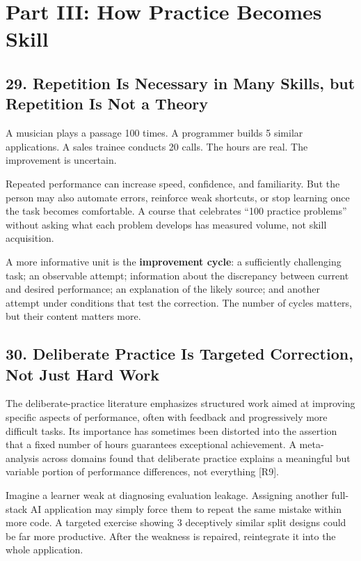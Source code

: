 \section*{Part III: How Practice Becomes Skill}

\subsection*{29. Repetition Is Necessary in Many Skills, but Repetition Is Not a Theory}

A musician plays a passage 100 times. A programmer builds 5 similar applications. A sales trainee conducts 20 calls. The hours are real. The improvement is uncertain.

Repeated performance can increase speed, confidence, and familiarity. But the person may also automate errors, reinforce weak shortcuts, or stop learning once the task becomes comfortable. A course that celebrates ``100 practice problems'' without asking what each problem develops has measured volume, not skill acquisition.

A more informative unit is the \textbf{improvement cycle}: a sufficiently challenging task; an observable attempt; information about the discrepancy between current and desired performance; an explanation of the likely source; and another attempt under conditions that test the correction. The number of cycles matters, but their content matters more.

\subsection*{30. Deliberate Practice Is Targeted Correction, Not Just Hard Work}

The deliberate-practice literature emphasizes structured work aimed at improving specific aspects of performance, often with feedback and progressively more difficult tasks. Its importance has sometimes been distorted into the assertion that a fixed number of hours guarantees exceptional achievement. A meta-analysis across domains found that deliberate practice explains a meaningful but variable portion of performance differences, not everything [R9].

Imagine a learner weak at diagnosing evaluation leakage. Assigning another full-stack AI application may simply force them to repeat the same mistake within more code. A targeted exercise showing 3 deceptively similar split designs could be far more productive. After the weakness is repaired, reintegrate it into the whole application.

